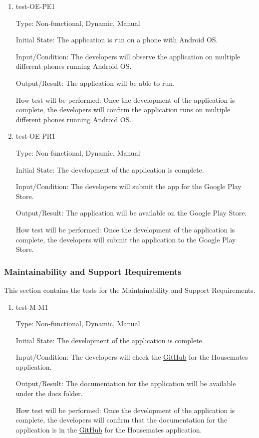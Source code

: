 \documentclass[12pt, titlepage]{article}
\begin{document}
\begin{enumerate}

\item{test-OE-PE1\\}

Type: Non-functional, Dynamic, Manual 
					
Initial State: The application is run on a phone with Android OS.
					
Input/Condition: The developers will observe the application on multiple different phones running Android OS.
					
Output/Result: The application will be able to run.
					
How test will be performed: Once the development of the application is complete, the developers will confirm the application runs on multiple different phones running Android OS.
					
\item{test-OE-PR1\\}

Type: Non-functional, Dynamic, Manual 
					
Initial State: The development of the application is complete.
					
Input/Condition: The developers will submit the app for the Google Play Store.
					
Output/Result: The application will be available on the Google Play Store.
					
How test will be performed: Once the development of the application is complete, the developers will submit the application to the Google Play Store.
\end{enumerate}

\subsubsection{Maintainability and Support Requirements}

This section contains the tests for the Maintainability and Support Requirements.
		
\begin{enumerate}

\item{test-M-M1\\}

Type: Non-functional, Dynamic, Manual 
					
Initial State: The development of the application is complete.
					
Input/Condition: The developers will check the \href{https://github.com/DangJustin/CapstoneProject}{GitHub}  for the Housemates application.
					
Output/Result: The documentation for the application will be available under the docs folder.
					
How test will be performed: Once the development of the application is complete, the developers will confirm that the documentation for the application is in the \href{https://github.com/DangJustin/CapstoneProject}{GitHub} for the Housemates application.
					

\end{enumerate}
\end{document}
